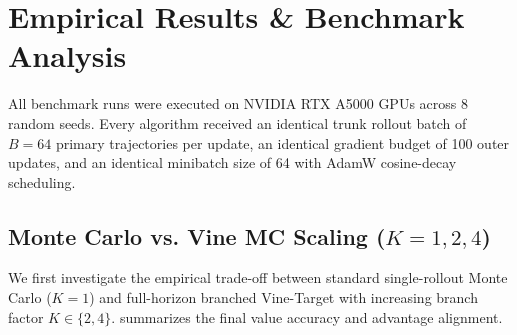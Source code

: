 \documentclass[11pt,a4paper]{article}
\begin{document}
\newpage

\section{Empirical Results \& Benchmark Analysis}

All benchmark runs were executed on NVIDIA RTX A5000 GPUs across 8 random seeds. Every algorithm received an identical trunk rollout batch of $B = 64$ primary trajectories per update, an identical gradient budget of 100 outer updates, and an identical minibatch size of 64 with AdamW cosine-decay scheduling.

\subsection{\texorpdfstring{Monte Carlo vs. Vine MC Scaling ($K=1, 2, 4$)}{Monte Carlo vs. Vine MC Scaling (K=1, 2, 4)}}

We first investigate the empirical trade-off between standard single-rollout Monte Carlo ($K=1$) and full-horizon branched Vine-Target with increasing branch factor $K \in \{2, 4\}$.  summarizes the final value accuracy and advantage alignment.

\begin{table}[ht!]
\centering
\small
\renewcommand{\arraystretch}{1.2}
\caption{\textbf{Empirical Comparison: Standard MC vs. Vine-Target ($K=2, 4$).} Across 8 seeds on DAG and Tree full suites. Adv AUC denotes the compute-normalized Area Under the Advantage Cosine curve.}
\label{tab:mc_vs_vine_metrics}
\end{table}
\end{document}
